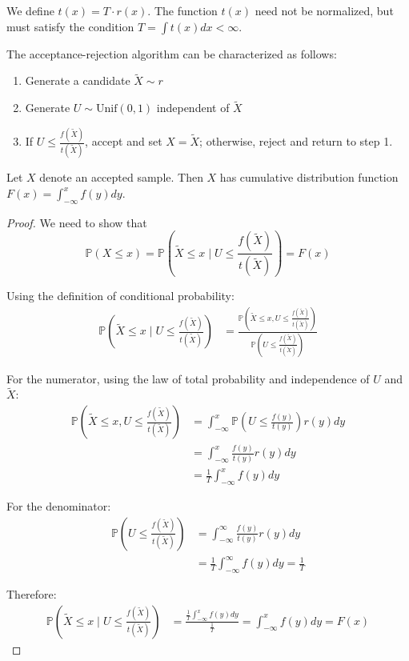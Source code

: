We define $t(x) = T \cdot r(x)$. The function $t(x)$ need not be normalized, but must satisfy the condition $T = \int t(x)dx < \infty$.

The acceptance-rejection algorithm can be characterized as follows:
\begin{enumerate}
    \item Generate a candidate $\tilde{X} \sim r$
    \item Generate $U \sim \text{Unif}(0,1)$ independent of $\tilde{X}$
    \item If $U \leq \frac{f(\tilde{X})}{t(\tilde{X})}$, accept and set $X = \tilde{X}$; otherwise, reject and return to step 1.
\end{enumerate}

\begin{theoremrep}
Let $X$ denote an accepted sample. Then $X$ has cumulative distribution function $F(x) = \int_{-\infty}^x f(y)dy$.
\end{theoremrep}

\begin{proof}
We need to show that 
$$\mathbb{P}(X \leq x) = \mathbb{P}\left(\tilde{X} \leq x \mid U \leq \frac{f(\tilde{X})}{t(\tilde{X})}\right) = F(x)$$

Using the definition of conditional probability:
\begin{align*}
    \mathbb{P}\left(\tilde{X} \leq x \mid U \leq \frac{f(\tilde{X})}{t(\tilde{X})}\right) &= \frac{
    \mathbb{P}\left(\tilde{X} \leq x, U \leq \frac{f(\tilde{X})}{t(\tilde{X})}\right)}{\mathbb{P}\left(U \leq \frac{f(\tilde{X})}{t(\tilde{X})}\right)}
\end{align*}

For the numerator, using the law of total probability and independence of $U$ and $\tilde{X}$:
\begin{align*}
    \mathbb{P}\left(\tilde{X} \leq x, U \leq \frac{f(\tilde{X})}{t(\tilde{X})}\right) &= \int_{-\infty}^x \mathbb{P}\left(U \leq \frac{f(y)}{t(y)}\right) r(y) dy \\
    &= \int_{-\infty}^x \frac{f(y)}{t(y)} r(y) dy \\
    &= \frac{1}{T}\int_{-\infty}^x f(y) dy
\end{align*}

For the denominator:
\begin{align*}
    \mathbb{P}\left(U \leq \frac{f(\tilde{X})}{t(\tilde{X})}\right) &= \int_{-\infty}^{\infty} \frac{f(y)}{t(y)} r(y) dy \\
    &= \frac{1}{T}\int_{-\infty}^{\infty} f(y) dy = \frac{1}{T}
\end{align*}

Therefore:
\begin{align*}
    \mathbb{P}\left(\tilde{X} \leq x \mid U \leq \frac{f(\tilde{X})}{t(\tilde{X})}\right) &= \frac{\frac{1}{T}\int_{-\infty}^x f(y) dy}{\frac{1}{T}} = \int_{-\infty}^x f(y) dy = F(x)
\end{align*}
\end{proof}

